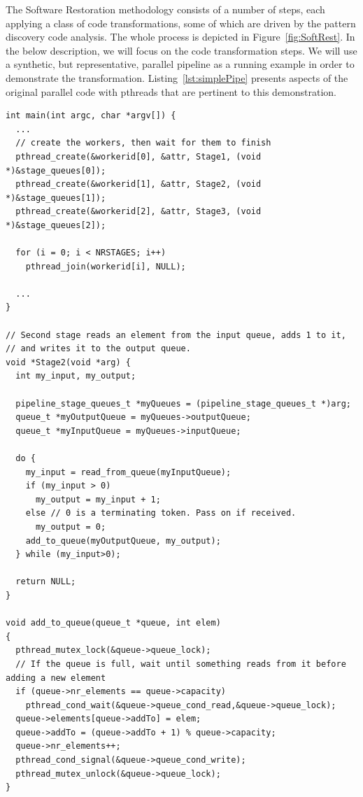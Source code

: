 The Software Restoration methodology consists of a number of steps, each applying a class of code transformations, some of which are driven by the pattern discovery code analysis.  The whole process is depicted in Figure~\ref{fig:SoftRest}. In the below description, we will focus on the code transformation steps. We will use a synthetic, but representative, parallel pipeline as a running example in order to demonstrate the transformation. Listing~\ref{lst:simplePipe} presents aspects of the original parallel code with pthreads that are pertinent to this demonstration.

\begin{lstlisting}[caption=Original Simple Pipeline Code,frame=single,label=lst:simplePipe]
int main(int argc, char *argv[]) {
  ...  
  // create the workers, then wait for them to finish
  pthread_create(&workerid[0], &attr, Stage1, (void *)&stage_queues[0]);
  pthread_create(&workerid[1], &attr, Stage2, (void *)&stage_queues[1]);
  pthread_create(&workerid[2], &attr, Stage3, (void *)&stage_queues[2]);
  
  for (i = 0; i < NRSTAGES; i++)
    pthread_join(workerid[i], NULL);
  
  ...
}

// Second stage reads an element from the input queue, adds 1 to it,
// and writes it to the output queue.
void *Stage2(void *arg) {
  int my_input, my_output;
  
  pipeline_stage_queues_t *myQueues = (pipeline_stage_queues_t *)arg;
  queue_t *myOutputQueue = myQueues->outputQueue;
  queue_t *myInputQueue = myQueues->inputQueue;
  
  do {
    my_input = read_from_queue(myInputQueue);
    if (my_input > 0)
      my_output = my_input + 1;
    else // 0 is a terminating token. Pass on if received.
      my_output = 0;
    add_to_queue(myOutputQueue, my_output);
  } while (my_input>0);
  
  return NULL;
}

void add_to_queue(queue_t *queue, int elem)
{
  pthread_mutex_lock(&queue->queue_lock);
  // If the queue is full, wait until something reads from it before adding a new element
  if (queue->nr_elements == queue->capacity)
    pthread_cond_wait(&queue->queue_cond_read,&queue->queue_lock);
  queue->elements[queue->addTo] = elem;
  queue->addTo = (queue->addTo + 1) % queue->capacity;
  queue->nr_elements++;
  pthread_cond_signal(&queue->queue_cond_write);
  pthread_mutex_unlock(&queue->queue_lock);
}
\end{lstlisting}

